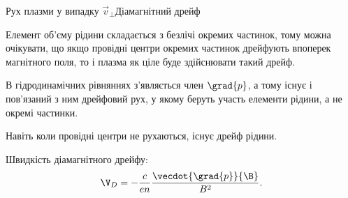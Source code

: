 \documentclass[]{beamer}
\begin{document}
\begin{frame}{Рух плазми у випадку $\vec{v}_\perp$}{Діамагнітний дрейф}
	\begin{block}{}\justifying
		Елемент об'єму рідини складається з безлічі окремих частинок, тому можна очікувати, що якщо провідні центри окремих частинок дрейфують впоперек магнітного поля, то і плазма як ціле буде здійснювати такий дрейф.

		\medskip

		В гідродинамічних рівняннях з'являється член $\grad{p}$, а тому існує і пов'язаний з ним \alert{дрейфовий рух}, у якому \alert{беруть участь елементи рідини}, а \alert{не окремі частинки}.

		\medskip

		Навіть коли провідні центри не рухаються, існує дрейф рідини.

		\medskip

		Швидкість діамагнітного дрейфу:
		\begin{equation*}
			\V_D = -\frac{c}{en}\frac{\vecdot{\grad{p}}{\B}}{B^2}.
		\end{equation*}
	\end{block}
\end{frame}


\end{document}
